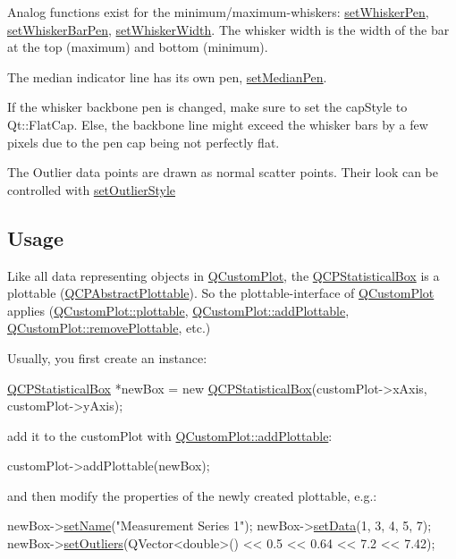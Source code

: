 Analog functions exist for the minimum/maximum-\/whiskers\-: \hyperlink{class_q_c_p_statistical_box_a4a5034cb3b9b040444df05ab1684620b}{set\-Whisker\-Pen}, \hyperlink{class_q_c_p_statistical_box_aa8d3e503897788e1abf68dc74b5f147f}{set\-Whisker\-Bar\-Pen}, \hyperlink{class_q_c_p_statistical_box_adf378812446bd66f34d1f7f293d991cd}{set\-Whisker\-Width}. The whisker width is the width of the bar at the top (maximum) and bottom (minimum).

The median indicator line has its own pen, \hyperlink{class_q_c_p_statistical_box_a7260ac55b669f5d0a74f16d5ca84c52c}{set\-Median\-Pen}.

If the whisker backbone pen is changed, make sure to set the cap\-Style to Qt\-::\-Flat\-Cap. Else, the backbone line might exceed the whisker bars by a few pixels due to the pen cap being not perfectly flat.

The Outlier data points are drawn as normal scatter points. Their look can be controlled with \hyperlink{class_q_c_p_statistical_box_ad5241943422eb8e58360a97e99ad6aa7}{set\-Outlier\-Style}\hypertarget{class_q_c_p_statistical_box_usage}{}\subsection{Usage}\label{class_q_c_p_statistical_box_usage}
Like all data representing objects in \hyperlink{class_q_custom_plot}{Q\-Custom\-Plot}, the \hyperlink{class_q_c_p_statistical_box}{Q\-C\-P\-Statistical\-Box} is a plottable (\hyperlink{class_q_c_p_abstract_plottable}{Q\-C\-P\-Abstract\-Plottable}). So the plottable-\/interface of \hyperlink{class_q_custom_plot}{Q\-Custom\-Plot} applies (\hyperlink{class_q_custom_plot_a32de81ff53e263e785b83b52ecd99d6f}{Q\-Custom\-Plot\-::plottable}, \hyperlink{class_q_custom_plot_ab7ad9174f701f9c6f64e378df77927a6}{Q\-Custom\-Plot\-::add\-Plottable}, \hyperlink{class_q_custom_plot_af3dafd56884208474f311d6226513ab2}{Q\-Custom\-Plot\-::remove\-Plottable}, etc.)

Usually, you first create an instance\-: 
\begin{DoxyCode}
\hyperlink{class_q_c_p_statistical_box}{QCPStatisticalBox} *newBox = \textcolor{keyword}{new} \hyperlink{class_q_c_p_statistical_box_a75c2b3e7fcd0741cc981693a2ba63b27}{QCPStatisticalBox}(customPlot->xAxis, 
      customPlot->yAxis);
\end{DoxyCode}
 add it to the custom\-Plot with \hyperlink{class_q_custom_plot_ab7ad9174f701f9c6f64e378df77927a6}{Q\-Custom\-Plot\-::add\-Plottable}\-: 
\begin{DoxyCode}
customPlot->addPlottable(newBox);
\end{DoxyCode}
 and then modify the properties of the newly created plottable, e.\-g.\-: 
\begin{DoxyCode}
newBox->\hyperlink{class_q_c_p_abstract_plottable_ab79c7ba76bc7fa89a4b3580e12149f1f}{setName}(\textcolor{stringliteral}{"Measurement Series 1"});
newBox->\hyperlink{class_q_c_p_statistical_box_adf50c57b635edb12470c0e4a986aff37}{setData}(1, 3, 4, 5, 7);
newBox->\hyperlink{class_q_c_p_statistical_box_af9bc09620e0bf93bf444ee35e5800d1d}{setOutliers}(QVector<double>() << 0.5 << 0.64 << 7.2 << 7.42);
\end{DoxyCode}
 

